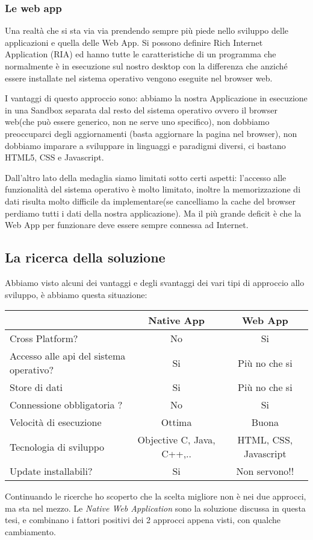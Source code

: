 \subsubsection{Le web app}
Una realtà che si sta via via prendendo sempre più piede nello sviluppo delle applicazioni e quella delle Web App. Si possono definire Rich Internet Application (RIA) ed hanno tutte le caratteristiche di un programma che normalmente è in esecuzione sul nostro desktop con la differenza che anziché essere installate nel sistema operativo vengono eseguite nel browser web. 

I vantaggi di questo approccio sono: abbiamo la nostra Applicazione in esecuzione in una Sandbox separata dal resto del sistema operativo ovvero il browser web(che può essere generico, non ne serve uno specifico), non dobbiamo preoccuparci degli aggiornamenti (basta aggiornare la pagina nel browser), non dobbiamo imparare a sviluppare in linguaggi e paradigmi diversi, ci bastano HTML5, CSS e Javascript.

Dall'altro lato della medaglia siamo limitati sotto certi aspetti: l'accesso alle funzionalità del sistema operativo è molto limitato, inoltre la memorizzazione di dati risulta molto difficile da implementare(se cancelliamo la cache del browser perdiamo tutti i dati della nostra applicazione). Ma il più grande deficit è che la Web App per funzionare deve essere sempre connessa ad Internet. 
\subsection{La ricerca della soluzione}  
Abbiamo visto alcuni dei vantaggi e degli svantaggi dei vari tipi di approccio allo sviluppo, è abbiamo questa situazione:
\begin{center}
	\begin{tabular}{| l || c | c | }
		\hline
							&	Native App	&	Web App       \\
		\hline
		\hline
			Cross Platform?	&	No			&	Si            \\
		\hline
			Accesso alle api 
			del sistema 
			operativo?		&	Si			&	Più no che si \\
		\hline
			Store di dati	&	Si			&	Più no che si \\
		\hline
			Connessione 
			obbligatoria ?	&	No			&	Si 			  \\
		\hline
			Velocità di 
			esecuzione	    &	Ottima	 	& 	Buona \\
		\hline
			Tecnologia di 
			sviluppo		&	Objective C, 
			  					Java, C++,..	&	HTML, CSS, Javascript \\
		\hline
			Update 
			installabili?	&	Si			&	Non servono!! \\	
		\hline		
	\end{tabular}
\end{center}
Continuando le ricerche ho scoperto che la scelta migliore non è nei due approcci, ma sta nel mezzo.
Le \emph{Native Web Application} sono la soluzione discussa in questa tesi, e combinano i fattori positivi dei 2 approcci appena visti, con qualche cambiamento.